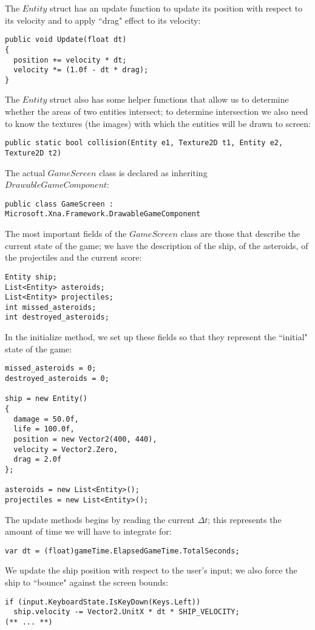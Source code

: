 The $Entity$ struct has an update function to update its position with respect to its velocity and to apply ``drag" effect to its velocity:
\begin{lstlisting}
public void Update(float dt)
{
  position += velocity * dt;
  velocity *= (1.0f - dt * drag);
}
\end{lstlisting}

The $Entity$ struct also has some helper functions that allow us to determine whether the areas of two entities intersect; to determine intersection we also need to know the textures (the images) with which the entities will be drawn to screen:
\begin{lstlisting}
public static bool collision(Entity e1, Texture2D t1, Entity e2, Texture2D t2)
\end{lstlisting}

The actual $GameScreen$ class is declared as inheriting $DrawableGameComponent$:
\begin{lstlisting}
public class GameScreen : Microsoft.Xna.Framework.DrawableGameComponent
\end{lstlisting}

The most important fields of the $GameScreen$ class are those that describe the current state of the game; we have the description of the ship, of the asteroids, of the projectiles and the current score:
\begin{lstlisting}
Entity ship;
List<Entity> asteroids;
List<Entity> projectiles;
int missed_asteroids;
int destroyed_asteroids;
\end{lstlisting}

In the initialize method, we set up these fields so that they represent the ``initial" state of the game:
\begin{lstlisting}
missed_asteroids = 0;
destroyed_asteroids = 0;

ship = new Entity()
{
  damage = 50.0f,
  life = 100.0f,
  position = new Vector2(400, 440),
  velocity = Vector2.Zero,
  drag = 2.0f
};

asteroids = new List<Entity>();
projectiles = new List<Entity>();
\end{lstlisting}

The update methods begins by reading the current $\Delta t$; this represents the amount of time we will have to integrate for:
\begin{lstlisting}
var dt = (float)gameTime.ElapsedGameTime.TotalSeconds;
\end{lstlisting}

We update the ship position with respect to the user's input; we also force the ship to ``bounce" against the screen bounds:
\begin{lstlisting}
if (input.KeyboardState.IsKeyDown(Keys.Left))
  ship.velocity -= Vector2.UnitX * dt * SHIP_VELOCITY;
(** ... **)
\end{lstlisting}


